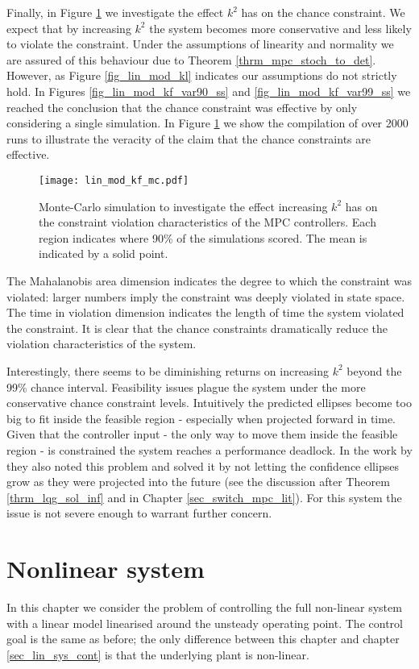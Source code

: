 Finally, in Figure \ref{fig_lin_mod_kf_mc} we investigate the effect $k^2$ has on the chance constraint. We expect that by increasing $k^2$ the system becomes more conservative and less likely to violate the constraint. Under the assumptions of linearity and normality we are assured of this behaviour due to Theorem \ref{thrm_mpc_stoch_to_det}. However, as Figure \ref{fig_lin_mod_kl} indicates our assumptions do not  strictly hold. In Figures \ref{fig_lin_mod_kf_var90_ss} and \ref{fig_lin_mod_kf_var99_ss} we reached the conclusion that the chance constraint was effective by only considering a single simulation. In Figure \ref{fig_lin_mod_kf_mc} we show the compilation of over 2000 runs to illustrate the veracity of the claim that the chance constraints are effective.
\begin{figure}[H] 
\centering
\texttt{[image: lin\_mod\_kf\_mc.pdf]}
\caption{Monte-Carlo simulation to investigate the effect increasing $k^2$ has on the constraint violation characteristics of the MPC controllers. Each region indicates where 90\% of the simulations scored. The mean is indicated by a solid point.}
\label{fig_lin_mod_kf_mc}
\end{figure}
The Mahalanobis area dimension indicates the degree to which the constraint was violated: larger numbers imply the constraint was deeply violated in state space. The time in violation dimension indicates the length of time the system violated the constraint. It is clear that the chance constraints dramatically reduce the violation characteristics of the system. 

Interestingly, there seems to be diminishing returns on increasing $k^2$ beyond the 99\% chance interval. Feasibility issues plague the system under the more conservative chance constraint levels. Intuitively the predicted ellipses become too big to fit inside the feasible region - especially when projected forward in time. Given that the controller input - the only way to move them inside the feasible region - is constrained the system reaches a performance deadlock. In the work by \cite{yan1} they also noted this problem and solved it by not letting the confidence ellipses grow as they were projected into the future (see the discussion after Theorem \ref{thrm_lqg_sol_inf} and in Chapter \ref{sec_switch_mpc_lit}). For this system the issue is not severe enough to warrant further concern.   

\section{Nonlinear system}
\label{sec_nonlinear_control}
In this chapter we consider the problem of controlling the full non-linear system with a linear model linearised around the unsteady operating point. The control goal is the same as before; the only difference between this chapter and chapter \ref{sec_lin_sys_cont} is that the underlying plant is non-linear.

